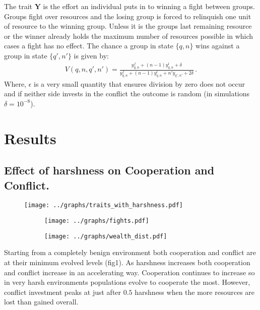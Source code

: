 The trait $\mathbf{Y}$ is the effort an individual puts in to winning a fight between groups. Groups fight over resources and the losing group is forced to relinquish one unit of resource to the winning group. Unless it is the groups last remaining resource or the winner already holds the maximum number of resources possible in which cases a fight has no effect. The chance a group in state $\{q,n\}$ wins against a group in state $\{q',n'\}$ is given by:
\begin{align}
    V(q, n, q', n') = \frac{y^f_{q,n} + (n-1)y^l_{q,n} + \delta}{y^f_{q,n} + (n-1)y^l_{q,n} + n'y_{q',n'} + 2\delta}\,.
\end{align}
Where, $\epsilon$ is a very small quantity that ensures division by zero does not occur and if neither side invests in the conflict the outcome is random (in simulations $\delta = 10^{-8}$). 

\section{Results}
\subsection{Effect of harshness on Cooperation and Conflict.}
\begin{figure}[th]
    \texttt{[image: ../graphs/traits\_with\_harshness.pdf]}
    \caption{}
    \label{fig:traits_harshness}
\end{figure}
\begin{figure}
    \centering
    \begin{subfigure}[b]{.49\linewidth}
      \centering
      \texttt{[image: ../graphs/fights.pdf]}
      \caption{}
    \end{subfigure}\hfill
    \begin{subfigure}[b]{.49\linewidth}
      \centering  
      \texttt{[image: ../graphs/wealth\_dist.pdf]}
      \caption{}
    \end{subfigure}
    \caption{}
    \label{fig:relatedness}
  \end{figure}
Starting from a completely benign environment both cooperation and conflict are at their minimum evolved levels (fig1). As harshness increases both cooperation and conflict increase in an accelerating way. Cooperation continues to increase so in very harsh environments populations evolve to cooperate the most. However, conflict investment peaks at just after $0.5$ harshness when the more resources are lost than gained overall.  

